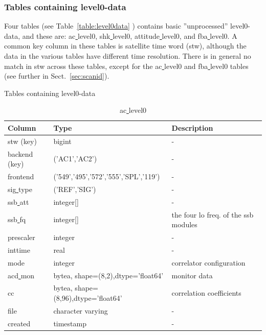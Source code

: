 \documentclass[12pt]{article}
\begin{document}
\clearpage
\newpage


\subsubsection{Tables containing level0-data}
Four tables (see Table~\ref{table:level0data} ) contains basic ''unprocessed''  
level0-data, and these are: 
ac\underline{ }level0, shk\underline{ }level0, attitude\underline{ }level0,
and fba\underline{ }level0.
A common key column in these tables is satellite time word (stw),
although the data in the various tables have different time resolution.
There is in general no match in stw across these tables, except
for the ac\underline{ }level0 and fba\underline{ }level0 tables
(see  further in Sect.~\ref{sec:scanid}).


\begin{table}
 \begin{tiny}    
   \captionsetup{font=scriptsize}
    \caption{Tables containing level0-data}
     \label{table:level0data}
    \begin{subtable}{.9\linewidth}
      \captionsetup{font=scriptsize}
      \centering
       \label{table:ac0}
\caption{ac\underline{ }level0}
      \begin{tabular}{l l l}
\hline
\hline
Column & Type & Description \\ [0.5ex]
\hline
stw (key)            & bigint                                &  - \\
backend (key)        & ('AC1','AC2')                         & -\\
frontend             & ('549','495','572','555','SPL','119') & -\\
sig\underline{ }type & ('REF','SIG')                         & -\\
ssb\underline{ }att  & integer[]                             & -\\
ssb\underline{ }fq   & integer[]                             & the four lo freq. of the ssb modules\\
prescaler            & integer                               & -\\
inttime              & real                                  & -\\
mode                 & integer                               & correlator configuration\\
acd\underline{ }mon  & bytea, shape=(8,2),dtype='float64'    & monitor data\\
cc                   & bytea, shape=(8,96),dtype='float64'   & correlation coefficients\\
file                     & character varying                  & -\\
created                        & timestamp                   & -\\[1ex]
\hline
\end{tabular}


\end{subtable}
\end{tiny}
\end{table}
\end{document}

